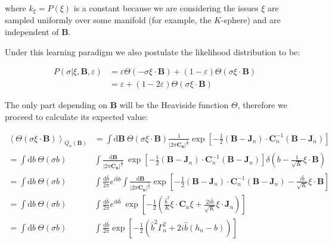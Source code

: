\documentclass[12pt,a4paperpaper,]{tufte-book}
\begin{document}
where \(k_\xi = P(\xi)\) is a constant because we are considering the issues \(\xi\) are sampled uniformly over some manifold (for example, the \(K\)-sphere) and are independent of \(\mathbf{B}\).

Under this learning paradigm we also postulate the likelihood distribution to be:

\begin{align}
     P( \sigma | \xi, \mathbf{B}, \varepsilon) &= \varepsilon \Theta( -\sigma \xi \cdot \mathbf{B}) + (1-\varepsilon)\Theta( \sigma \xi \cdot \mathbf{B}) \\
    &= \varepsilon + (1 - 2\varepsilon) \Theta( \sigma \xi \cdot \mathbf{B})
\end{align}

The only part depending on \(\mathbf{B}\) will be the Heaviside function \(\Theta\), therefore we proceed to calculate its expected value:

\begin{align}
     \left\langle \Theta( \sigma \xi \cdot \mathbf{B}) \right\rangle_{Q_n(\mathbf{B})} &= \int \mathrm{d}\mathbf{B}\ \Theta\left( \sigma \xi \cdot \mathbf{B}\right) \frac{1}{\left| 2\pi \mathbf{C_n}\right|^{\frac12}} \exp \left[ -\frac12 (\mathbf{B}- \mathbf{J}_n) \cdot \mathbf{C}_n^{-1} (\mathbf{B}- \mathbf{J}_n) \right] \\
     = \int \mathrm{d}b\ \Theta(\sigma b)\ &\int \frac{\mathrm{d}\mathbf{B}}{\left| 2\pi \mathbf{C_n}\right|^{\frac12}}\ \exp \left[ -\frac12 (\mathbf{B}- \mathbf{J}_n) \cdot \mathbf{C}_n^{-1} (\mathbf{B}- \mathbf{J}_n) \right] \delta \left( b - \frac{1}{\sqrt{K}} \xi \cdot \mathbf{B}\right) \\
     = \int \mathrm{d}b\ \Theta(\sigma b)\ &\int \frac{\mathrm{d}\hat{b}}{2\pi} e^{i\hat{b}b} \int \frac{\mathrm{d}\mathbf{B}}{\left| 2\pi \mathbf{C_n}\right|^{\frac12}} \exp \left[ -\frac12 (\mathbf{B}- \mathbf{J}_n) \cdot \mathbf{C}_n^{-1} (\mathbf{B}- \mathbf{J}_n) - \frac{i\hat{b}}{\sqrt{K}} \xi \cdot \mathbf{B}\right] \\
     = \int \mathrm{d}b\ \Theta(\sigma b)\ &\int \frac{\mathrm{d}\hat{b}}{2\pi} e^{ib\hat{b}}\ \exp \left[ -\frac12 \left( \frac{\hat{b}^2}{K} \xi \cdot \mathbf{C}_n \xi + \frac{2i\hat{b}}{\sqrt{K}} \xi \cdot \mathbf{J}_n \right) \right] \\
     = \int \mathrm{d}b\ \Theta(\sigma b)\ &\int \frac{\mathrm{d}\hat{b}}{2\pi} \exp \left[ -\frac12 \left( \hat{b}^2\Gamma_n^2 + 2i\hat{b} (h_n - b) \right) \right]
\end{align}
\end{document}
